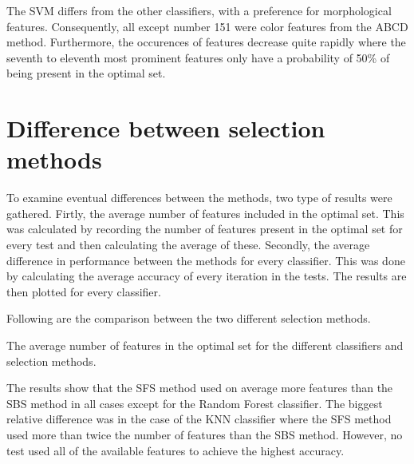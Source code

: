\documentclass{kththesis}
\begin{document}
The SVM differs from the other classifiers, with a preference for morphological features. Consequently, all except number 151 were color features from the ABCD method. Furthermore, the occurences of features decrease quite rapidly where the seventh to eleventh most prominent features only have a probability of 50\% of being present in the optimal set. 

\newpage

\section{Difference between selection methods}

To examine eventual differences between the methods, two type of results were gathered. Firtly, the average number of features included in the optimal set. This was calculated by recording the number of features present in the optimal set for every test and then calculating the average of these. Secondly, the average difference in performance between the methods for every classifier. This was done by calculating the average accuracy of every iteration in the tests. The results are then plotted for every classifier. 

Following are the comparison between the two different selection methods. 


\begin{table}[h!]
  \begin{center}
    \caption{The average number of features in the optimal set for the different classifiers and selection methods.}
  \end{center}
\end{table}

The results show that the SFS method used on average more features than the SBS method in all cases except for the Random Forest classifier. The biggest relative difference was in the case of the KNN classifier where the SFS method used more than twice the number of features than the SBS method. However, no test used all of the available features to achieve the highest accuracy.
\end{document}
